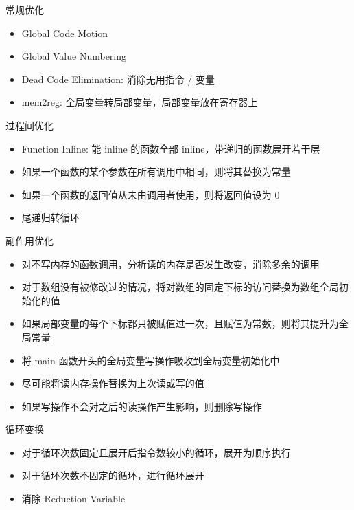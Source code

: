\documentclass[aspectratio=169,UTF-8]{ctexbeamer}
\begin{document}
		\begin{frame}{常规优化}
			\begin{itemize}
				\item Global Code Motion
				\item Global Value Numbering
				\item Dead Code Elimination: 消除无用指令 / 变量
				\item mem2reg: 全局变量转局部变量，局部变量放在寄存器上
			\end{itemize}
		\end{frame}
		
		\begin{frame}{过程间优化}
			\begin{itemize}
				\item Function Inline: 能 inline 的函数全部 inline，带递归的函数展开若干层
				\item 如果一个函数的某个参数在所有调用中相同，则将其替换为常量	
				\item 如果一个函数的返回值从未由调用者使用，则将返回值设为 0
				\item 尾递归转循环
			\end{itemize}
		\end{frame}
		
		\begin{frame}{副作用优化}
			\begin{itemize}
				\item 对不写内存的函数调用，分析读的内存是否发生改变，消除多余的调用
				\item 对于数组没有被修改过的情况，将对数组的固定下标的访问替换为数组全局初始化的值
				\item 如果局部变量的每个下标都只被赋值过一次，且赋值为常数，则将其提升为全局常量
				\item 将 main 函数开头的全局变量写操作吸收到全局变量初始化中
				\item 尽可能将读内存操作替换为上次读或写的值
				\item 如果写操作不会对之后的读操作产生影响，则删除写操作
			\end{itemize}
		\end{frame}
		
		\begin{frame}{循环变换}
			\begin{itemize}
				\item 对于循环次数固定且展开后指令数较小的循环，展开为顺序执行
				\item 对于循环次数不固定的循环，进行循环展开
				\item 消除 Reduction Variable
			\end{itemize}
		\end{frame}
		
\end{document}
